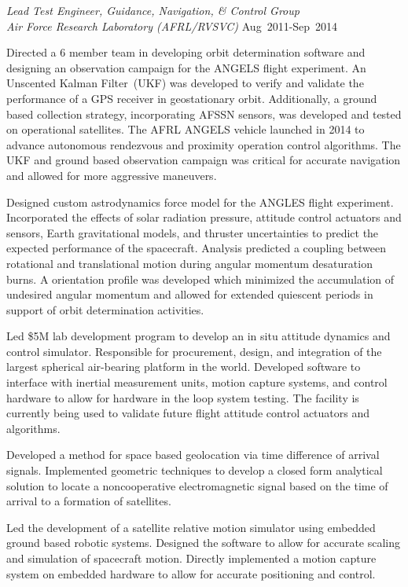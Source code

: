 \documentclass[10pt]{article}
\begin{document}
\begin{lonelist}
\item[] \textit{Lead Test Engineer, Guidance, Navigation, \& Control Group \\
	Air Force Research Laboratory (AFRL/RVSVC)}%
    \hfill {Aug~2011-Sep~2014}
    \begin{innerlist}
        \item Directed a 6 member team in developing orbit determination software and designing an observation campaign for the ANGELS flight experiment.
        An Unscented Kalman Filter~(UKF) was developed to verify and validate the performance of a GPS receiver in geostationary orbit.
        Additionally, a ground based collection strategy, incorporating AFSSN sensors, was developed and tested on operational satellites.
        The AFRL ANGELS vehicle launched in 2014 to advance autonomous rendezvous and proximity operation control algorithms.
        The UKF and ground based observation campaign was critical for accurate navigation and allowed for more aggressive maneuvers. 
		\item Designed custom astrodynamics force model for the ANGLES flight experiment.
		Incorporated the effects of solar radiation pressure, attitude control actuators and sensors, Earth gravitational models, and thruster uncertainties to predict the expected performance of the spacecraft.
		Analysis predicted a coupling between rotational and translational motion during angular momentum desaturation burns.
		A orientation profile was developed which minimized the accumulation of undesired angular momentum and allowed for extended quiescent periods in support of orbit determination activities.
        \item Led \$5M lab development program to develop an in situ attitude dynamics and control simulator.  
        Responsible for procurement, design, and integration of the largest spherical air-bearing platform in the world.
        Developed software to interface with inertial measurement units, motion capture systems, and control hardware to allow for hardware in the loop system testing.
        The facility is currently being used to validate future flight attitude control actuators and algorithms. 
        \item Developed a method for space based geolocation via time difference of arrival signals.
        Implemented geometric techniques to develop a closed form analytical solution to locate a noncooperative electromagnetic signal based on the time of arrival to a formation of satellites.
        \item Led the development of a satellite relative motion simulator using embedded ground based robotic systems.
        Designed the software to allow for accurate scaling and simulation of spacecraft motion.
        Directly implemented a motion capture system on embedded hardware to allow for accurate positioning and control. 
    \end{innerlist}


\end{lonelist}
\end{document}
